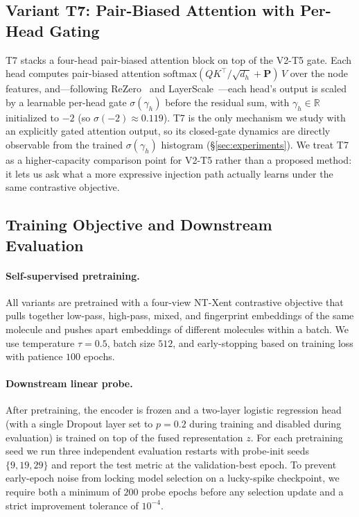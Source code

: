 \documentclass[sigconf,nonacm,anonymous,review]{acmart}
\begin{document}
\subsection{Variant T7: Pair-Biased Attention with Per-Head Gating}
\label{sec:t7}
T7 stacks a four-head pair-biased attention block on top of the V2-T5 gate. Each head computes pair-biased attention $\mathrm{softmax}(QK^\top/\sqrt{d_h} + \mathbf{P})\,V$ over the node features, and---following ReZero~\cite{bachlechner2021rezero} and LayerScale~\cite{touvron2021cait}---each head's output is scaled by a learnable per-head gate $\sigma(\gamma_h)$ before the residual sum, with $\gamma_h\in\mathbb{R}$ initialized to $-2$ (so $\sigma({-}2)\approx 0.119$). T7 is the only mechanism we study with an explicitly gated attention output, so its closed-gate dynamics are directly observable from the trained $\sigma(\gamma_h)$ histogram (\S\ref{sec:experiments}). We treat T7 as a higher-capacity comparison point for V2-T5 rather than a proposed method: it lets us ask what a more expressive injection path actually learns under the same contrastive objective.

\subsection{Training Objective and Downstream Evaluation}
\label{sec:training}
\paragraph{Self-supervised pretraining.} All variants are pretrained with a four-view NT-Xent contrastive objective that pulls together low-pass, high-pass, mixed, and fingerprint embeddings of the same molecule and pushes apart embeddings of different molecules within a batch. We use temperature $\tau{=}0.5$, batch size $512$, and early-stopping based on training loss with patience $100$ epochs.

\paragraph{Downstream linear probe.} After pretraining, the encoder is frozen and a two-layer logistic regression head (with a single Dropout layer set to $p{=}0.2$ during training and disabled during evaluation) is trained on top of the fused representation $z$. For each pretraining seed we run three independent evaluation restarts with probe-init seeds $\{9,19,29\}$ and report the test metric at the validation-best epoch. To prevent early-epoch noise from locking model selection on a lucky-spike checkpoint, we require both a minimum of $200$ probe epochs before any selection update and a strict improvement tolerance of $10^{-4}$.
\end{document}
